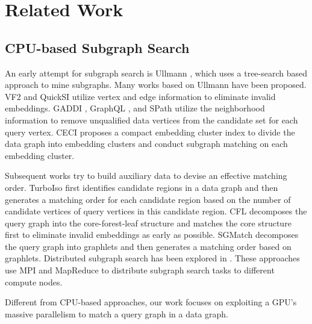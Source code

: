 \section{Related Work}
\subsection{CPU-based Subgraph Search}
An early attempt for subgraph search is Ullmann \cite{ullmann1976algorithm}, which uses a tree-search based approach to mine subgraphs. Many works \cite{cordella2001improved, shang2008taming,zhang2009gaddi,he2008graphs,zhao2010graph} based on Ullmann have been proposed. VF2 \cite{cordella2001improved} and QuickSI \cite{shang2008taming} utilize vertex and edge information to eliminate invalid embeddings. GADDI \cite{zhang2009gaddi}, GraphQL \cite{he2008graphs}, and SPath \cite{zhao2010graph} utilize the neighborhood information to remove unqualified data vertices from the candidate set for each query vertex. CECI \cite{bhattarai2019ceci} proposes a compact embedding cluster index to divide the data graph into embedding clusters and conduct subgraph matching on each embedding cluster.

Subsequent works \cite{han2013turboiso,ren2015exploiting,bi2016efficient,han2019efficient,rivero2017efficient} try to build auxiliary data to devise an effective matching order. TurboIso \cite{han2013turboiso} first identifies candidate regions in a data graph and then generates a matching order for each candidate region based on the number of candidate vertices of query vertices in this candidate region. CFL \cite{bi2016efficient} decomposes the query graph into the core-forest-leaf structure and matches the core structure first to eliminate invalid embeddings as early as possible. SGMatch \cite{rivero2017efficient} decomposes the query graph into graphlets and then generates a matching order based on graphlets. Distributed subgraph search has been explored in \cite{afrati2013enumerating, shao2014parallel,shi2020graphpi,talukder2016distributed,sun2018parallelizing,plantenga2013inexact,reza2018prunejuice}. These approaches use MPI and MapReduce to distribute subgraph search tasks to different compute nodes.

Different from CPU-based approaches, our work focuses on exploiting a GPU's massive parallelism to match a query graph in a data graph.

